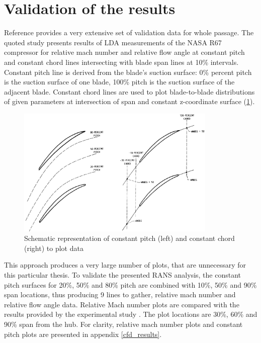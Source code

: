 \section{Validation of the results}
Reference \citep{r67laser} provides a very extensive set of validation data for whole passage. The quoted study presents results of LDA measurements of the NASA R67 compressor for relative mach number and relative flow angle at constant pitch and constant chord lines intersecting with blade span lines at 10\% intervals. Constant pitch line is derived from the blade's suction surface: 0\% percent pitch is the suction surface of one blade, 100\% pitch is the suction surface of the adjacent blade. Constant chord lines are used to plot blade-to-blade distributions of given parameters at intersection of span and constant z-coordinate surface (\ref{fig_LA}).

\begin{figure}[h!]
\centering %
\includegraphics[width=0.85\textwidth]{Pictures/LA.png}
\caption{Schematic representation of constant pitch (left) and constant chord (right) to plot data \citep{r67laser}}
\label{fig_LA}
\end{figure}

This approach produces a very large number of plots, that are unnecessary for this particular thesis. To validate the presented RANS analysis, the constant pitch surfaces for 20\%, 50\% and 80\% pitch are combined with 10\%, 50\% and 90\% span locations, thus producing 9 lines to gather, relative mach number and relative flow angle data. Relative Mach number plots are compared with the results provided by the experimental study \citep{r67laser}. The plot locations are 30\%, 60\% and 90\% span from the hub. For clarity, relative mach number plots and constant pitch plots are presented in appendix \ref{cfd_results}.

